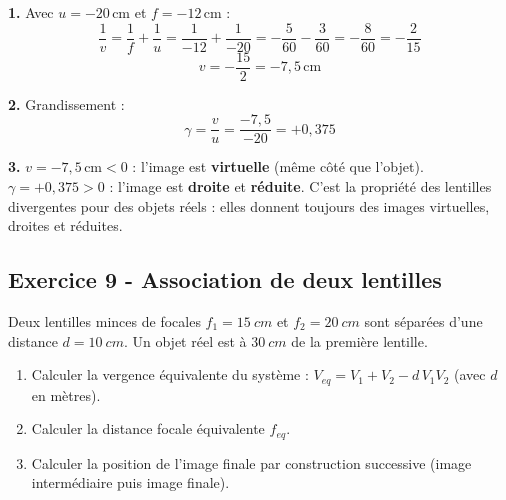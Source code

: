 \documentclass[12pt,a4paper]{article}
\begin{document}
\begin{boitecorrige}
\textbf{1.} Avec $u = -20\,\text{cm}$ et $f = -12\,\text{cm}$ :
\[
\frac{1}{v} = \frac{1}{f} + \frac{1}{u} = \frac{1}{-12} + \frac{1}{-20} = -\frac{5}{60} - \frac{3}{60} = -\frac{8}{60} = -\frac{2}{15}
\]
\[
v = -\frac{15}{2} = -7{,}5\,\text{cm}
\]

\textbf{2.} Grandissement :
\[
\gamma = \frac{v}{u} = \frac{-7{,}5}{-20} = +0{,}375
\]

\textbf{3.} $v = -7{,}5\,\text{cm} < 0$ : l'image est \textbf{virtuelle} (même côté que l'objet). $\gamma = +0{,}375 > 0$ : l'image est \textbf{droite} et \textbf{réduite}. C'est la propriété des lentilles divergentes pour des objets réels : elles donnent toujours des images virtuelles, droites et réduites.
\end{boitecorrige}

\subsection*{Exercice 9 - Association de deux lentilles \niveau{\moyen}}

\begin{boiteexercice}
Deux lentilles minces de focales $f_1 = \qty{15}{cm}$ et $f_2 = \qty{20}{cm}$ sont séparées d'une distance $d = \qty{10}{cm}$. Un objet réel est à $\qty{30}{cm}$ de la première lentille.
\begin{enumerate}
  \item Calculer la vergence équivalente du système : $V_{eq} = V_1 + V_2 - d\,V_1 V_2$ (avec $d$ en mètres).
  \item Calculer la distance focale équivalente $f_{eq}$.
  \item Calculer la position de l'image finale par construction successive (image intermédiaire puis image finale).
\end{enumerate}
\end{boiteexercice}
\end{document}
